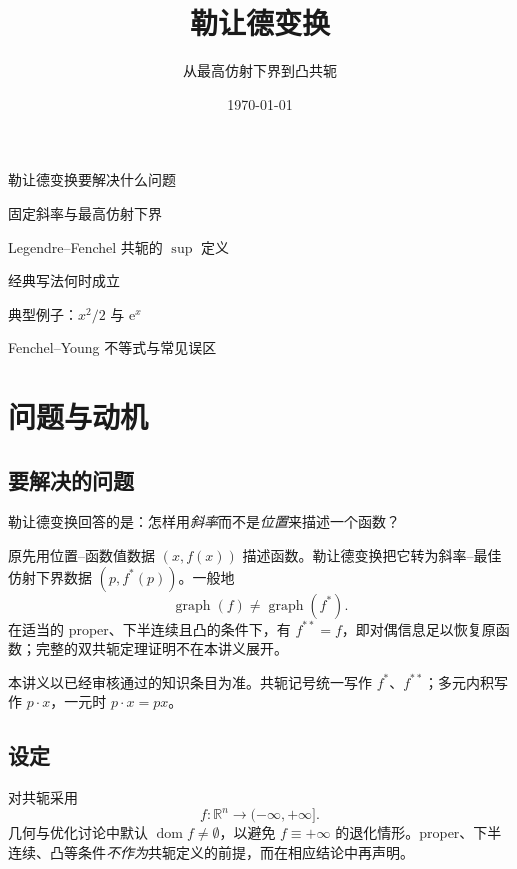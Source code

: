 \documentclass[
    lang=cn,
    color=blue,
    mode=fancy,
    thmcnt=section,
    scheme=chinese,
    chinesefont=ctexfont
]{elegantbook}
\title{勒让德变换}
\subtitle{从最高仿射下界到凸共轭}
\author{}
\institute{}
\date{\today}
\newcommand{\R}{\mathbb{R}}
\newcommand{\e}{\mathrm{e}}
\DeclareMathOperator{\dom}{dom}
\newcommand{\fstar}{f^{\ast}}
\newcommand{\fstarp}{f^{\ast}(p)}
\newcommand{\fstardd}{f^{\ast\ast}}
\begin{document}

\maketitle

\frontmatter

\begin{introduction}
  \item 勒让德变换要解决什么问题
  \item 固定斜率与最高仿射下界
  \item Legendre--Fenchel 共轭的 $\sup$ 定义
  \item 经典写法何时成立
  \item 典型例子：$x^{2}/2$ 与 $\e^{x}$
  \item Fenchel--Young 不等式与常见误区
\end{introduction}

\tableofcontents

\mainmatter


\chapter{问题与动机}

\section{要解决的问题}

勒让德变换回答的是：怎样用\emph{斜率}而不是\emph{位置}来描述一个函数？

原先用位置--函数值数据 $(x,f(x))$ 描述函数。勒让德变换把它转为斜率--最佳仿射下界数据 $(p,\fstarp)$。一般地
\[
\operatorname{graph}(f)\neq\operatorname{graph}(\fstar).
\]
在适当的 proper、下半连续且凸的条件下，有 $\fstardd=f$，即对偶信息足以恢复原函数；完整的双共轭定理证明不在本讲义展开。

\begin{note}
本讲义以已经审核通过的知识条目为准。共轭记号统一写作 $f^{\ast}$、$f^{\ast\ast}$；多元内积写作 $p\cdot x$，一元时 $p\cdot x=px$。
\end{note}


\section{设定}

对共轭采用
\[
f:\R^{n}\to(-\infty,+\infty].
\]
几何与优化讨论中默认 $\dom f\neq\emptyset$，以避免 $f\equiv+\infty$ 的退化情形。proper、下半连续、凸等条件\emph{不作为}共轭定义的前提，而在相应结论中再声明。
\end{document}
